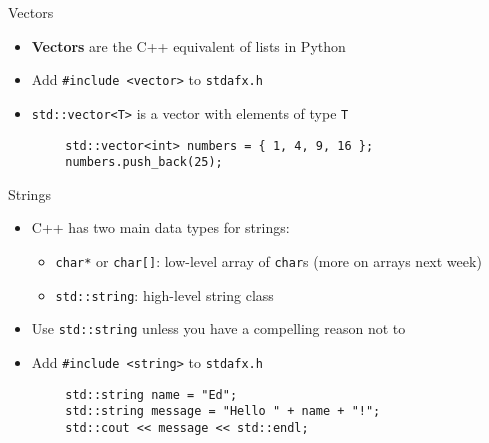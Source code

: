 \begin{frame}[fragile]{Vectors}
	\begin{itemize}
		\item \textbf{Vectors} are the C++ equivalent of lists in Python
		\pause
		\item Add \lstinline{#include <vector>} to \texttt{stdafx.h}
		\pause
		\item \lstinline{std::vector<T>} is a vector with elements of type \lstinline{T}
	\end{itemize}
	\pause
	\begin{lstlisting}
		std::vector<int> numbers = { 1, 4, 9, 16 };
		numbers.push_back(25);
	\end{lstlisting}
\end{frame}

\begin{frame}[fragile]{Strings}
	\begin{itemize}
		\item C++ has two main data types for strings:
		\begin{itemize}
			\item \lstinline{char*} or \lstinline{char[]}: low-level array of \lstinline{char}s (more on arrays next week)
			\item \lstinline{std::string}: high-level string class
		\end{itemize}
		\pause
		\item Use \lstinline{std::string} unless you have a compelling reason not to
		\pause
		\item Add \lstinline{#include <string>} to \texttt{stdafx.h}
	\end{itemize}
	\pause
	\begin{lstlisting}
		std::string name = "Ed";
		std::string message = "Hello " + name + "!";
		std::cout << message << std::endl;
	\end{lstlisting}
\end{frame}

